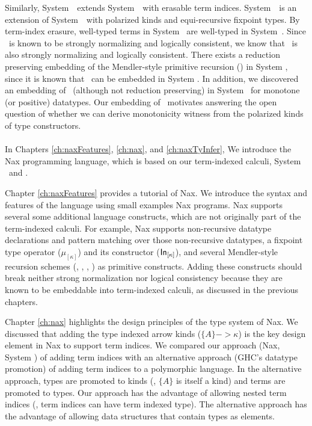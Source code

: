 Similarly, System~\Fixi\ extends System~\Fixw\ with erasable term indices.
System~\Fixw\ is an extension of System~\Fw\ with polarized kinds and
equi-recursive fixpoint types. By term-index erasure, well-typed terms
in System \Fixi\ are well-typed in System~\Fixw. Since \Fixw\ is known
to be strongly normalizing and logically consistent, we know that \Fixi\ is
also strongly normalizing and logically consistent.
There exists a reduction preserving embedding of the Mendler-style
primitive recursion (\MPr) in System \Fixi, since it is known that \MPr\ can
be embedded in System \Fixw. In addition, we discovered an embedding of \McvPr\ 
(although not reduction preserving) in System \Fixi\ for monotone (or positive)
datatypes. Our embedding of \McvPr\ motivates answering the open question of
whether we can derive monotonicity witness from the polarized kinds of
type constructors.

\paragraph{}
In Chapters \ref{ch:naxFeatures}, \ref{ch:nax}, and \ref{ch:naxTyInfer},
We introduce the Nax programming language, which is based on
our term-indexed calculi, System \Fi\ and \Fixi.

Chapter \ref{ch:naxFeatures} provides a tutorial of Nax.
We introduce the syntax and features of the language
using small examples Nax programs.
Nax supports several some additional language constructs,
which are not originally part of the term-indexed calculi.
For example, Nax supports non-recursive datatype declarations and
pattern matching over those non-recursive datatypes,
a fixpoint type operator ($\mu_{[\kappa]}$) and
its constructor ($\mathsf{In}_{[\kappa]}$), and
several Mendler-style recursion schemes (\MIt, \MPr, \McvPr, \MsfIt)
as primitive constructs. Adding these constructs should break neither
strong normalization nor logical consistency because they are known to
be embeddable into term-indexed calculi, as discussed in the previous chapters.

Chapter \ref{ch:nax} highlights the design principles of the type system of Nax.
We discussed that adding the type indexed arrow kinds ($\{A\} -> \kappa$) is
the key design element in Nax to support term indices.
We compared our approach (Nax, System \Fi) of adding term indices with
an alternative approach (GHC's datatype promotion) of adding
term indices to a polymorphic language. In the alternative approach,
types are promoted to kinds (\ie, $\{A\}$ is itself a kind) and
terms are promoted to types. Our approach has the advantage of
allowing nested term indices (\ie, term indices can have term indexed type).
The alternative approach has the advantage of allowing data structures that
contain types as elements.

